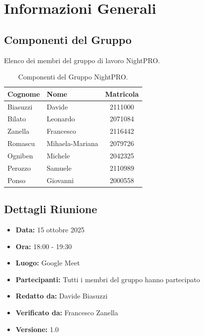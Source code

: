 \documentclass[a4paper, 11pt, oneside]{scrartcl} %
\begin{document}
\newpage
\tableofcontents %
\pagestyle{fancy} %

\newpage
\section{Informazioni Generali}

\subsection{Componenti del Gruppo}
Elenco dei membri del gruppo di lavoro NightPRO.

\begin{table}[h!]
\centering
\begin{tabular}{@{}llc@{}}
\toprule
\textbf{Cognome} & \textbf{Nome} & \textbf{Matricola} \\
\midrule
Biasuzzi & Davide & 2111000 \\
Bilato & Leonardo & 2071084 \\
Zanella & Francesco & 2116442 \\
Romascu & Mihaela-Mariana & 2079726 \\
Ogniben & Michele & 2042325 \\
Perozzo & Samuele & 2110989 \\
Ponso & Giovanni & 2000558 \\
\bottomrule
\end{tabular}
\caption{Componenti del Gruppo NightPRO.}
\end{table}

\subsection{Dettagli Riunione}
\begin{itemize}
    \item \textbf{Data:} 15 ottobre 2025
    \item \textbf{Ora:} 18:00 - 19:30
    \item \textbf{Luogo:} Google Meet
    \item \textbf{Partecipanti:} Tutti i membri del gruppo hanno partecipato
    \item  \textbf{Redatto da: } Davide Biasuzzi
    \item  \textbf{Verificato da:} Francesco Zanella
    \item \textbf{Versione: } 1.0
\end{itemize}
\end{document}
